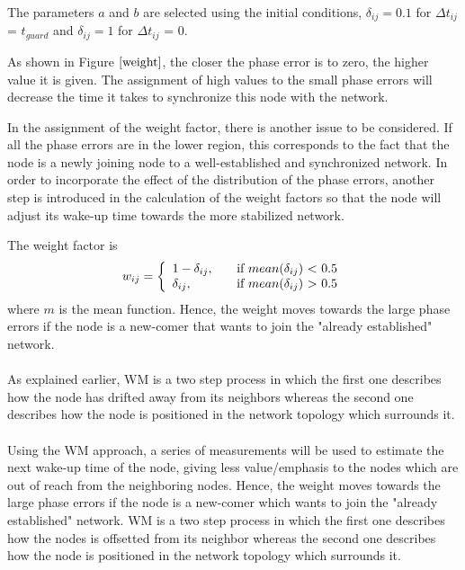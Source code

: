 \documentclass[a4paper,10pt]{report}
\begin{document}
The parameters $a$ and $b$ are selected using the initial conditions, $\delta_{ij}=0.1$ for $\Delta t_{ij}$ = $t_{guard}$ and $\delta_{ij}=1$ for $\Delta t_{ij}$ = 0.
\par
As shown in Figure $\ref{weight}$, the closer the phase error is to zero, the higher value it is given. The assignment of high values to the small phase errors will decrease the time it takes to synchronize  this node with the network.
\par
In the assignment of the weight factor, there is another issue to be
considered. If all the phase errors are in the lower region, this
corresponds to the fact that the node is a newly joining node to a
well-established and synchronized network.  In order to incorporate the
effect of the distribution of the phase errors, another step is introduced in the calculation of the weight factors so
that the node will adjust its wake-up time towards the more
stabilized network. \par
The weight factor is
\[w_{ij} = \left\{
\begin{array}{l l}
  1 - \delta_{ij},& \quad \mbox{if $mean(\delta_{ij}$) $<$ 0.5}\\
 \delta_{ij}, & \quad \mbox{if $mean(\delta_{ij}$) $>$ 0.5}\\ \end{array} \right. \]
where $m$ is the mean function.
Hence, the weight moves towards the large phase errors if the node is a new-comer that wants to join the "already established"
network.
\paragraph*{} As explained earlier, WM is a two step process in which the first one describes how the node has drifted away from its neighbors whereas the second one describes how the node is positioned in the network topology which surrounds it.
\paragraph*{}
Using the WM approach, a series of measurements will be used to estimate the next wake-up time of the node, giving less value/emphasis to the nodes which are out of reach from the neighboring nodes.
Hence, the weight moves towards the large phase errors if the node is a new-comer which wants to join the "already established" network. WM is a two step process in which the first one describes how the nodes is offsetted from its neighbor whereas the second one describes how the node is positioned in the network topology which surrounds it.
\end{document}
